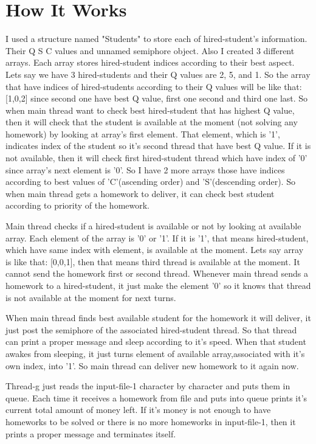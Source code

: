 \documentclass{article}
\begin{document}
\section{How It Works}
\par\hspace{\parindent} I used a structure named "Students" to store each of hired-student's information. Their Q S C values and unnamed semiphore object. Also I created 3 different arrays. Each array stores hired-student indices according to their best aspect. Lets say we have 3 hired-students and their Q values are 2, 5, and 1. So the array that have indices of hired-students according to their Q values will be like that: [1,0,2] since second one have best Q value, first one second and third one last. So when main thread want to check best hired-student that has highest Q value, then it will check that the student is available at the moment (not solving any homework) by looking at array's first element. That element, which is '1', indicates index of the student so it's second thread that have best Q value. If it is not available, then it will check first hired-student thread which have index of '0' since array's next element is '0'. So I have 2 more arrays those have indices according to best values of 'C'(ascending order) and 'S'(descending order). So when main thread gets a homework to deliver, it can check best student according to priority of the homework.
\par{\parindent} Main thread checks if a hired-student is available or not by looking at available array. Each element of the array is '0' or '1'. If it is '1', that means hired-student, which have same index with element, is available at the moment. Lets say array is like that: [0,0,1], then that means third thread is available at the moment. It cannot send the homework first or second thread. Whenever main thread sends a homework to a hired-student, it just make the element '0' so it knows that thread is not available at the moment for next turns.
\par{\parindent} When main thread finds best available student for the homework it will deliver, it just post the semiphore of the associated hired-student thread. So that thread can print a proper message and sleep according to it's speed. When that student awakes from sleeping, it just turns element of available array,associated with it's own index, into '1'. So main thread can deliver new homework to it again now. 
\par{\parindent}Thread-g just reads the input-file-1 character by character and puts them in queue. Each time it receives a homework from file and puts into queue prints it's current total amount of money left. If it's money is not enough to have homeworks to be solved or there is no more homeworks in input-file-1, then it prints a proper message and terminates itself. 
\end{document}
